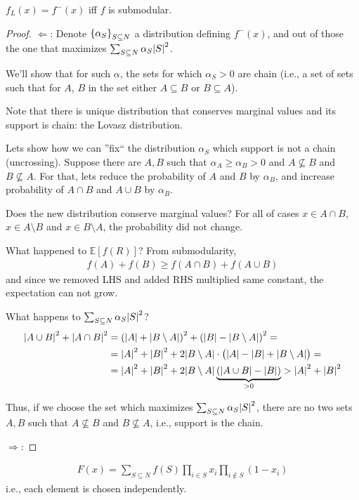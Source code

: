 \begin{theorem}[Lovasz]
	$f_L(x) = f^-(x)$ iff $f$ is submodular.
	\begin{proof}
		$\Leftarrow$:
		Denote $\qty{ \alpha_S}_{S\subseteq N}$ a distribution defining $f^-(x)$, and out of those the one that maximizes $\sum_{S \subseteq N} \alpha_S \abs{S}^2$.
		
		We'll show that for such $\alpha$, the sets for which $\alpha_S >0$ are chain (i.e., a set of sets such that for $A$, $B$ in the set either $A\subseteq B$ or $B\subseteq A$).
		
		Note that there is unique distribution that conserves marginal values and its support is chain: the Lovasz distribution. 
		
		Lets show how we can ''fix`` the distribution $\alpha_S$ which support is not a chain (uncrossing). Suppose there are $A,B$ such that $\alpha_A\geqslant \alpha_B >0$ and $A\not\subseteq B$ and  $B\not\subseteq A$.
		For that, lets reduce the probability of $A$ and $B$ by $\alpha_B$, and increase probability of $A\cap B$ and $A\cup B$ by $\alpha_B$.
		
		Does the new distribution conserve marginal values? For all of cases $x\in A\cap B$, $x\in A\setminus B$ and $x\in B\setminus A$, the probability did not change.
		
		What happened to $\mathbb{E} [f(R)]$? From submodularity,
		\begin{align}
		f(A) + f(B) \geqslant f(A\cap B) + f(A\cup B)
		\end{align}
		and since we removed LHS and added RHS multiplied same constant, the expectation can not grow.
		
		What happens to $\sum_{S \subseteq N} \alpha_S \abs{S}^2$?
		\begin{align}
		\abs{A\cup B}^2 + \abs{A\cap B}^2 &= \qty(\abs{A} + \abs{B\setminus A})^2 + \qty(\abs{B} - \abs{B\setminus A})^2 =\\&= \abs{A}^2+\abs{B}^2 + 2\abs{B\setminus A} \cdot \qty\big(\abs{A} - \abs{B} + \abs{B\setminus A}) =\\&= \abs{A}^2+\abs{B}^2 + 2\abs{B\setminus A}\underbrace{ \qty(\abs{A\cup B} - \abs{B})}_{>0} >  \abs{A}^2+\abs{B}^2
		\end{align}
		
		Thus, if we choose the set which maximizes $\sum_{S \subseteq N} \alpha_S \abs{S}^2$, there are no two sets $A,B$ such that $A\not\subseteq B$ and $B \not\subseteq A$, i.e., support is the chain.
		
		
		
		$\Rightarrow$:
	\end{proof}
\end{theorem}


\begin{definition}
	\begin{align}
	F(x) = \sum_{S \subseteq N} f(S) \prod_{i\in S} x_i \prod_{i \notin S} (1-x_i)
	\end{align}
	i.e., each element is chosen independently.
\end{definition}
